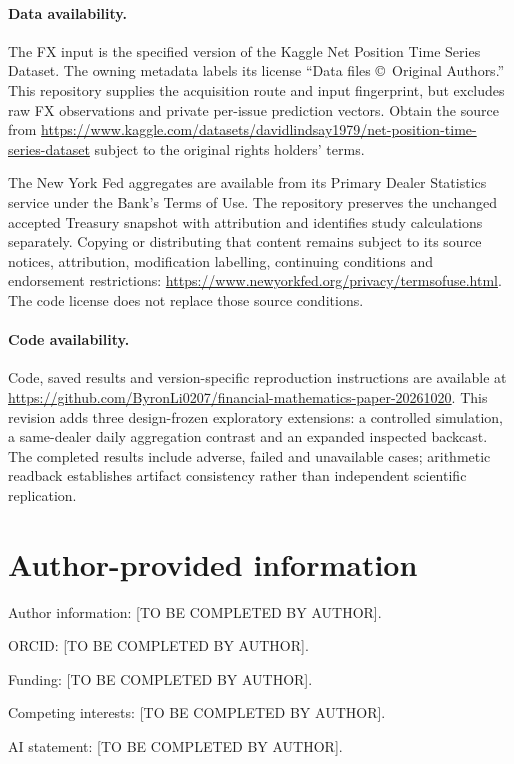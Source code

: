 \documentclass[11pt,a4paper]{article}
\begin{document}
\paragraph{Data availability.} The FX input is the specified version of the Kaggle Net Position Time Series Dataset. The owning metadata labels its license ``Data files \copyright\ Original Authors.'' This repository supplies the acquisition route and input fingerprint, but excludes raw FX observations and private per-issue prediction vectors. Obtain the source from \url{https://www.kaggle.com/datasets/davidlindsay1979/net-position-time-series-dataset} subject to the original rights holders' terms.

The New York Fed aggregates are available from its Primary Dealer Statistics service under the Bank's Terms of Use. The repository preserves the unchanged accepted Treasury snapshot with attribution and identifies study calculations separately. Copying or distributing that content remains subject to its source notices, attribution, modification labelling, continuing conditions and endorsement restrictions: \url{https://www.newyorkfed.org/privacy/termsofuse.html}. The code license does not replace those source conditions.

\paragraph{Code availability.} Code, saved results and version-specific reproduction instructions are available at \url{https://github.com/ByronLi0207/financial-mathematics-paper-20261020}. This revision adds three design-frozen exploratory extensions: a controlled simulation, a same-dealer daily aggregation contrast and an expanded inspected backcast. The completed results include adverse, failed and unavailable cases; arithmetic readback establishes artifact consistency rather than independent scientific replication.

\section*{Author-provided information}
Author information: [TO BE COMPLETED BY AUTHOR].\par
ORCID: [TO BE COMPLETED BY AUTHOR].\par
Funding: [TO BE COMPLETED BY AUTHOR].\par
Competing interests: [TO BE COMPLETED BY AUTHOR].\par
AI statement: [TO BE COMPLETED BY AUTHOR].
\end{document}
